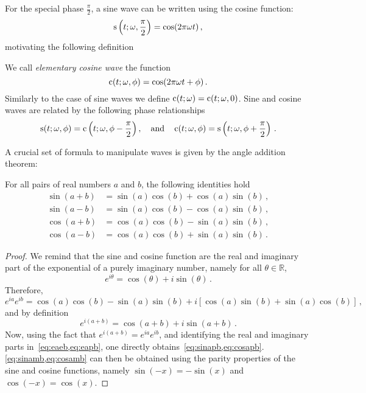 For the special phase $\frac{\pi}{2}$, a sine wave can be written using the cosine
function:
\begin{equation}
  \operatorname{s}\left(t;\omega,\frac{\pi}{2}\right)= \cos(2\pi\omega t)\,,
\end{equation}
motivating the following definition
\begin{definition}
  \label{def:cosine-wave}
  We call \emph{elementary cosine wave} the function
  \begin{equation}
    \operatorname{c}(t;\omega,\phi)=\cos(2\pi\omega t + \phi)\,.\label{eq:cosine-wave}
  \end{equation}
  Similarly to the case of sine waves we define $\operatorname{c}(t;\omega)=\operatorname{c}(t;\omega,0)$. Sine and
  cosine waves are related by the following phase relationships
  \begin{equation}
    \operatorname{s}(t;\omega,\phi)=\operatorname{c}\left(t;\omega,\phi-\frac{\pi}{2}\right),
    \quad\text{and}\quad
    \operatorname{c}(t;\omega,\phi)=\operatorname{s}\left(t;\omega,\phi+\frac{\pi}{2}\right)\,.
  \end{equation}
\end{definition}
A crucial set of formula to manipulate waves is given by the angle addition theorem:
\begin{theorem}
  \label{thm:angle-add}
  For all pairs of real numbers $a$ and $b$, the following identities hold
  \begin{align}
    \sin(a+b)&=\sin(a)\cos(b)+\cos(a)\sin(b)\,,\label{eq:sinapb}\\
    \sin(a-b)&=\sin(a)\cos(b)-\cos(a)\sin(b)\,,\label{eq:sinamb}\\
    \cos(a+b)&=\cos(a)\cos(b)-\sin(a)\sin(b)\,,\label{eq:cosapb}\\
    \cos(a-b)&=\cos(a)\cos(b)+\sin(a)\sin(b)\,.\label{eq:cosamb}
  \end{align}
\end{theorem}
\begin{proof}
  We remind that the sine and cosine function are the real and imaginary part of the
  exponential of a purely imaginary number, namely for all $\theta\in\mathbb{R}$,
  \begin{equation}
    e^{i\theta}=\cos(\theta)+i\sin(\theta)\,.
  \end{equation}
  Therefore,
  \begin{equation}
    e^{i a}e^{i b}=\cos(a)\cos(b)-\sin(a)\sin(b)+i[\cos(a)\sin(b)+\sin(a)\cos(b)]\,,
    \label{eq:eaeb}
  \end{equation}
  and by definition
  \begin{equation}
    e^{i(a+b)}=\cos(a+b)+i\sin(a+b)\,.\label{eq:eapb}
  \end{equation}
  Now, using the fact that $e^{i(a+b)}=e^{i a}e^{i b}$, and identifying the real and
  imaginary parts in~\cref{eq:eaeb,eq:eapb}, one directly
  obtains~\cref{eq:sinapb,eq:cosapb}. \cref{eq:sinamb,eq:cosamb} can then be obtained
  using the parity properties of the sine and cosine functions, namely $\sin(-x)=-\sin(x)$
  and $\cos(-x)=\cos(x)$.
\end{proof}
